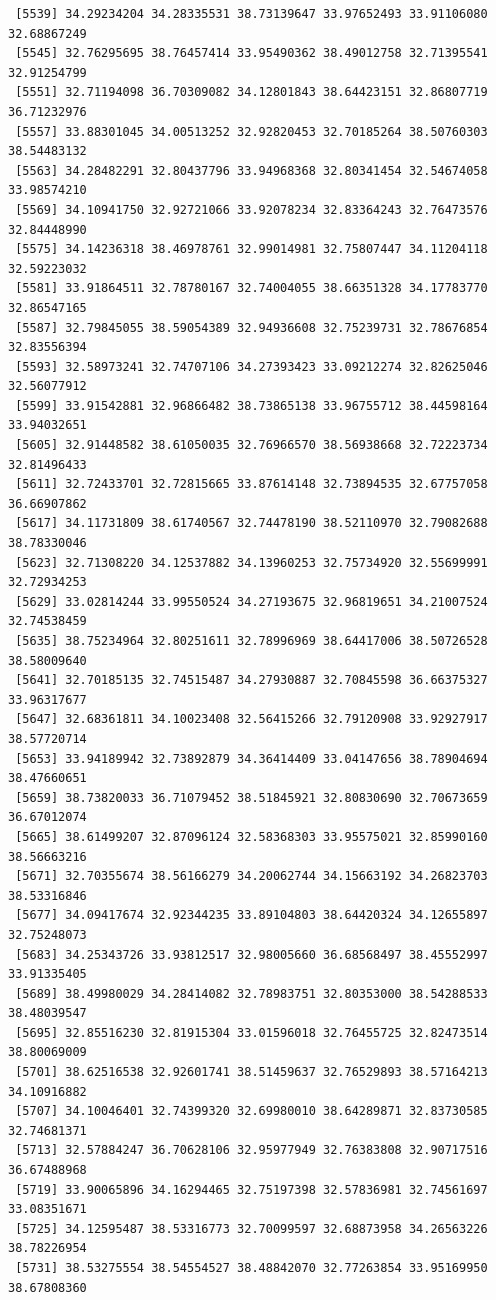 \documentclass[
  letterpaper,
  DIV=11,
  numbers=noendperiod]{scrartcl}
\begin{document}
\begin{verbatim}
 [5539] 34.29234204 34.28335531 38.73139647 33.97652493 33.91106080 32.68867249
 [5545] 32.76295695 38.76457414 33.95490362 38.49012758 32.71395541 32.91254799
 [5551] 32.71194098 36.70309082 34.12801843 38.64423151 32.86807719 36.71232976
 [5557] 33.88301045 34.00513252 32.92820453 32.70185264 38.50760303 38.54483132
 [5563] 34.28482291 32.80437796 33.94968368 32.80341454 32.54674058 33.98574210
 [5569] 34.10941750 32.92721066 33.92078234 32.83364243 32.76473576 32.84448990
 [5575] 34.14236318 38.46978761 32.99014981 32.75807447 34.11204118 32.59223032
 [5581] 33.91864511 32.78780167 32.74004055 38.66351328 34.17783770 32.86547165
 [5587] 32.79845055 38.59054389 32.94936608 32.75239731 32.78676854 32.83556394
 [5593] 32.58973241 32.74707106 34.27393423 33.09212274 32.82625046 32.56077912
 [5599] 33.91542881 32.96866482 38.73865138 33.96755712 38.44598164 33.94032651
 [5605] 32.91448582 38.61050035 32.76966570 38.56938668 32.72223734 32.81496433
 [5611] 32.72433701 32.72815665 33.87614148 32.73894535 32.67757058 36.66907862
 [5617] 34.11731809 38.61740567 32.74478190 38.52110970 32.79082688 38.78330046
 [5623] 32.71308220 34.12537882 34.13960253 32.75734920 32.55699991 32.72934253
 [5629] 33.02814244 33.99550524 34.27193675 32.96819651 34.21007524 32.74538459
 [5635] 38.75234964 32.80251611 32.78996969 38.64417006 38.50726528 38.58009640
 [5641] 32.70185135 32.74515487 34.27930887 32.70845598 36.66375327 33.96317677
 [5647] 32.68361811 34.10023408 32.56415266 32.79120908 33.92927917 38.57720714
 [5653] 33.94189942 32.73892879 34.36414409 33.04147656 38.78904694 38.47660651
 [5659] 38.73820033 36.71079452 38.51845921 32.80830690 32.70673659 36.67012074
 [5665] 38.61499207 32.87096124 32.58368303 33.95575021 32.85990160 38.56663216
 [5671] 32.70355674 38.56166279 34.20062744 34.15663192 34.26823703 38.53316846
 [5677] 34.09417674 32.92344235 33.89104803 38.64420324 34.12655897 32.75248073
 [5683] 34.25343726 33.93812517 32.98005660 36.68568497 38.45552997 33.91335405
 [5689] 38.49980029 34.28414082 32.78983751 32.80353000 38.54288533 38.48039547
 [5695] 32.85516230 32.81915304 33.01596018 32.76455725 32.82473514 38.80069009
 [5701] 38.62516538 32.92601741 38.51459637 32.76529893 38.57164213 34.10916882
 [5707] 34.10046401 32.74399320 32.69980010 38.64289871 32.83730585 32.74681371
 [5713] 32.57884247 36.70628106 32.95977949 32.76383808 32.90717516 36.67488968
 [5719] 33.90065896 34.16294465 32.75197398 32.57836981 32.74561697 33.08351671
 [5725] 34.12595487 38.53316773 32.70099597 32.68873958 34.26563226 38.78226954
 [5731] 38.53275554 38.54554527 38.48842070 32.77263854 33.95169950 38.67808360

\end{verbatim}
\end{document}
